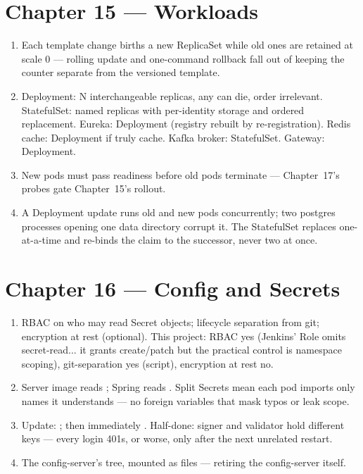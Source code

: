 \section*{Chapter 15 --- Workloads}
\begin{enumerate}
  \item Each template change births a new ReplicaSet while old ones
  are retained at scale 0 --- rolling update and one-command rollback
  fall out of keeping the counter separate from the versioned
  template.
  \item Deployment: N interchangeable replicas, any can die, order
  irrelevant. StatefulSet: named replicas with per-identity storage
  and ordered replacement. Eureka: Deployment (registry rebuilt by
  re-registration). Redis cache: Deployment if truly cache.
  Kafka broker: StatefulSet. Gateway: Deployment.
  \item New pods must pass readiness before old pods terminate ---
  Chapter~17's probes gate Chapter~15's rollout.
  \item A Deployment update runs old and new pods concurrently; two
  postgres processes opening one data directory corrupt it. The
  StatefulSet replaces one-at-a-time and re-binds the claim to the
  successor, never two at once.
\end{enumerate}

\section*{Chapter 16 --- Config and Secrets}
\begin{enumerate}
  \item RBAC on who may read Secret objects; lifecycle separation
  from git; encryption at rest (optional). This project: RBAC yes
  (Jenkins' Role omits secret-read... it grants create/patch but the
  practical control is namespace scoping), git-separation yes (script),
  encryption at rest no.
  \item Server image reads ; Spring reads
  . Split Secrets mean each pod imports
  only names it understands --- no foreign variables that mask typos
  or leak scope.
  \item Update: ; then
  immediately . Half-done: signer and validator hold
  different keys --- every login 401s, or worse, only after the next
  unrelated restart.
  \item The config-server's  tree, mounted
  as files --- retiring the config-server itself.
\end{enumerate}

